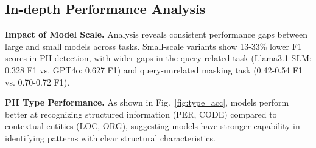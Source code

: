 
\subsection{In-depth Performance Analysis}

\noindent\textbf{Impact of Model Scale.}
Analysis reveals consistent performance gaps between large and small models across tasks. Small-scale variants show 13-33\% lower F1 scores in PII detection, with wider gaps in the query-related task (Llama3.1-SLM: 0.328 F1 vs. GPT4o: 0.627 F1) and query-unrelated masking task (0.42-0.54 F1 vs. 0.70-0.72 F1).


\noindent\textbf{PII Type Performance.} As shown in Fig.~\ref{fig:type_acc}, models perform better at recognizing structured information (PER, CODE) compared to contextual entities (LOC, ORG), suggesting models have stronger capability in identifying patterns with clear structural characteristics.

